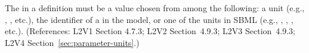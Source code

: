 The  in a \Parameter definition must be a value chosen from
among the following: a  unit (e.g., , ,
etc.), the identifier of a \UnitDefinition in the model, or one of the
 units in SBML (e.g., , , ,
etc.).  (References: L2V1 Section 4.7.3; L2V2 Section~4.9.3; L2V3
Section~4.9.3; L2V4 Section~\ref{sec:parameter-units}.)
